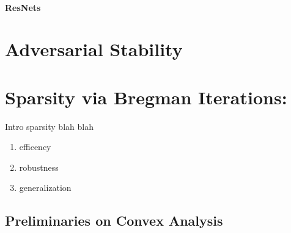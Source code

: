 \paragraph{ResNets}

%
\section{Adversarial Stability}

%
\section{Sparsity via Bregman Iterations: \cite{bungert2022bregman}}

Intro sparsity blah blah
%
\begin{enumerate}
\item efficency
\item robustness
\item generalization
\end{enumerate}
%
\subsection{Preliminaries on Convex Analysis}

